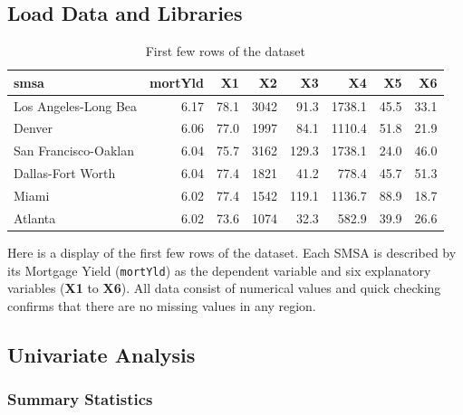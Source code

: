 \documentclass[
  11pt,
]{article}
\begin{document}
\subsection{Load Data and Libraries}\label{load-data-and-libraries}

\begingroup\fontsize{8}{10}\selectfont

\begin{longtable}[t]{lrrrrrrr}
\caption{\label{tab:unnamed-chunk-1}First few rows of the dataset}\\
\toprule
smsa & mortYld & X1 & X2 & X3 & X4 & X5 & X6\\
\midrule
Los Angeles-Long Bea & 6.17 & 78.1 & 3042 & 91.3 & 1738.1 & 45.5 & 33.1\\
Denver & 6.06 & 77.0 & 1997 & 84.1 & 1110.4 & 51.8 & 21.9\\
San Francisco-Oaklan & 6.04 & 75.7 & 3162 & 129.3 & 1738.1 & 24.0 & 46.0\\
Dallas-Fort Worth & 6.04 & 77.4 & 1821 & 41.2 & 778.4 & 45.7 & 51.3\\
Miami & 6.02 & 77.4 & 1542 & 119.1 & 1136.7 & 88.9 & 18.7\\
\addlinespace
Atlanta & 6.02 & 73.6 & 1074 & 32.3 & 582.9 & 39.9 & 26.6\\
\bottomrule
\end{longtable}
\endgroup{}

Here is a display of the first few rows of the dataset. Each SMSA is
described by its Mortgage Yield (\texttt{mortYld}) as the dependent
variable and six explanatory variables (\textbf{X1} to \textbf{X6}). All
data consist of numerical values and quick checking confirms that there
are no missing values in any region.

\subsection{Univariate Analysis}\label{univariate-analysis}

\subsubsection{Summary Statistics}\label{summary-statistics}

\begingroup\fontsize{8}{10}\selectfont
\end{document}
